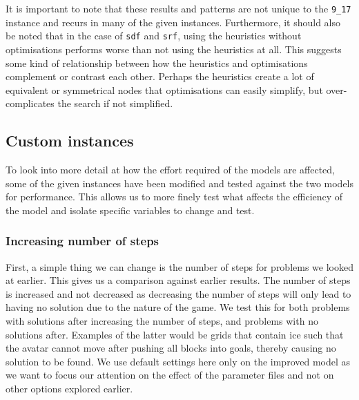 \documentclass{article}
\begin{document}
\noindent
It is important to note that these results and patterns are not unique to the \texttt{9\_17} instance and recurs in many of the given instances. Furthermore, it should also be noted that in the case of \texttt{sdf} and \texttt{srf}, using the heuristics without optimisations performs worse than not using the heuristics at all. This suggests some kind of relationship between how the heuristics and optimisations complement or contrast each other. Perhaps the heuristics create a lot of equivalent or symmetrical nodes that optimisations can easily simplify, but over-complicates the search if not simplified.

\subsection{Custom instances}
To look into more detail at how the effort required of the models are affected, some of the given instances have been modified and tested against the two models for performance. This allows us to more finely test what affects the efficiency of the model and isolate specific variables to change and test.


\subsubsection{Increasing number of steps}
First, a simple thing we can change is the number of steps for problems we looked at earlier. This gives us a comparison against earlier results. The number of steps is increased and not decreased as decreasing the number of steps will only lead to having no solution due to the nature of the game. We test this for both problems with solutions after increasing the number of steps, and problems with no solutions after. Examples of the latter would be grids that contain ice such that the avatar cannot move after pushing all blocks into goals, thereby causing no solution to be found. We use default settings here only on the improved model as we want to focus our attention on the effect of the parameter files and not on other options explored earlier. 
\end{document}
